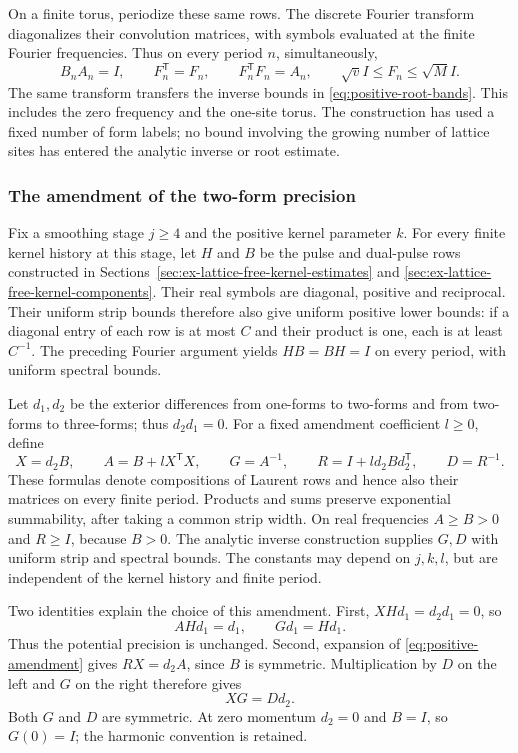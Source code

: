 On a finite torus, periodize these same rows. The discrete Fourier
transform diagonalizes their convolution matrices, with symbols
evaluated at the finite Fourier frequencies. Thus on every period
$n$, simultaneously,
\begin{equation}\label{eq:positive-row-periods}
 B_nA_n=I,\qquad F_n^{\mathsf T}=F_n,\qquad
 F_n^{\mathsf T}F_n=A_n,
 \qquad \sqrt v I\le F_n\le\sqrt M I.
\end{equation}
The same transform transfers the inverse bounds in
\eqref{eq:positive-root-bands}. This includes the zero frequency
and the one-site torus. The construction has used a fixed number
of form labels; no bound involving the growing number of lattice
sites has entered the analytic inverse or root estimate.

\subsubsection{The amendment of the two-form precision}
Fix a smoothing stage $j\ge4$ and the positive kernel parameter
$k$. For every finite kernel history at this stage, let $H$ and $B$ be the
pulse and dual-pulse rows constructed in
Sections~\ref{sec:ex-lattice-free-kernel-estimates} and
\ref{sec:ex-lattice-free-kernel-components}. Their real symbols are
diagonal, positive and reciprocal. Their uniform strip bounds
therefore also give uniform positive lower bounds: if a diagonal
entry of each row is at most $C$ and their product is one, each
is at least $C^{-1}$. The preceding Fourier argument yields
$HB=BH=I$ on every period, with uniform spectral bounds.

Let $d_1,d_2$ be the exterior differences from one-forms to
two-forms and from two-forms to three-forms; thus $d_2d_1=0$.
For a fixed amendment coefficient $l\ge0$, define
\begin{equation}\label{eq:positive-amendment}
 X=d_2B,\qquad A=B+lX^{\mathsf T}X,\qquad
 G=A^{-1},\qquad R=I+l d_2B d_2^{\mathsf T},\qquad D=R^{-1}.
\end{equation}
These formulas denote compositions of Laurent rows and hence also
their matrices on every finite period. Products and sums preserve
exponential summability, after taking a common strip width.
On real frequencies $A\ge B>0$ and $R\ge I$, because $B>0$.
The analytic inverse construction supplies $G,D$ with uniform
strip and spectral bounds. The constants may depend on $j,k,l$,
but are independent of the kernel history and finite period.

Two identities explain the choice of this amendment. First,
$XHd_1=d_2d_1=0$, so
\[
                       AHd_1=d_1,\qquad Gd_1=Hd_1.
\]
Thus the potential precision is unchanged. Second, expansion of
\eqref{eq:positive-amendment} gives $RX=d_2A$, since $B$ is
symmetric. Multiplication by $D$ on the left and $G$ on the right
therefore gives
\begin{equation}\label{eq:positive-amendment-intertwine}
                              XG=Dd_2.
\end{equation}
Both $G$ and $D$ are symmetric. At zero momentum $d_2=0$ and
$B=I$, so $G(0)=I$; the harmonic convention is retained.

